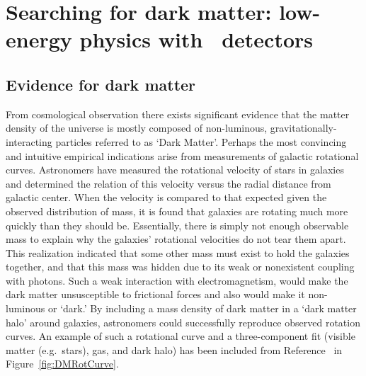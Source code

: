 

	\section{Searching for dark matter: low-energy physics with \ppc~detectors}
	
		\subsection{Evidence for dark matter}
	From cosmological observation there exists significant evidence that the matter density of the universe is mostly composed of non-luminous, gravitationally-interacting particles referred to as `Dark Matter'.  Perhaps the most convincing and intuitive empirical indications arise from measurements of galactic rotational curves.  Astronomers have measured the rotational velocity of stars in galaxies and determined the relation of this velocity versus the radial distance from galactic center.  When the velocity is compared to that expected given the observed distribution of mass, it is found that galaxies are rotating much more quickly than they should be.  Essentially, there is simply not enough observable mass to explain why the galaxies' rotational velocities do not tear them apart.  This realization indicated that some other mass must exist to hold the galaxies together, and that this mass was hidden due to its weak or nonexistent coupling with photons.  Such a weak interaction with electromagnetism, would make the dark matter unsusceptible to frictional forces and also would make it non-luminous or `dark.'  By including a mass density of dark matter in a `dark matter halo' around galaxies, astronomers could successfully reproduce observed rotation curves.  An example of such a rotational curve and a three-component fit (visible matter (e.g.~stars), gas, and dark halo) has been included from Reference~\cite{Begeman:1991iy} in Figure~\ref{fig:DMRotCurve}.

